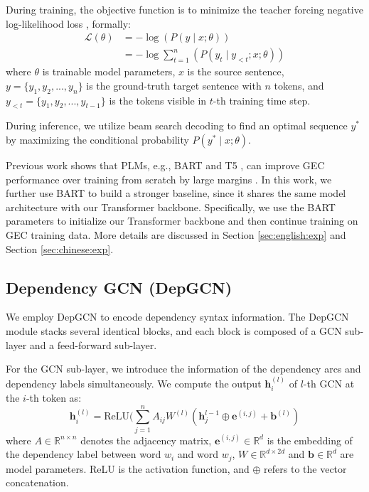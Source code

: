 \documentclass[11pt]{article}
\begin{document}
During training, the objective function is to minimize the teacher forcing negative log-likelihood loss \citep{williams1989learning}, formally:
\begin{equation}
\begin{aligned}
\mathcal{L}(\theta) &=- \log (P(y \mid x;\theta))\\
                &=- \log \sum_{t=1}^{n}(P(y_t \mid y_{<t};x;\theta))
\end{aligned}
\end{equation}
where $\theta$ is trainable model parameters, $x$ is the source sentence,  $y=\{y_1,y_2,...,y_n\}$ is the ground-truth target sentence with $n$ tokens, and  $y_{<t}=\{y_1,y_2,...,y_{t-1}\}$ is the tokens visible in $t$-th training time step.

During inference,  we utilize beam search decoding \citep{DBLP:conf/emnlp/WisemanR16} to find an optimal sequence $y^*$ by maximizing the conditional probability $P(y^* \mid x;\theta)$.  

Previous work shows that PLMs, e.g., BART \citep{lewis2020bart} and T5 \citep{raffel2020exploring}, can improve GEC performance over training from scratch by large margins \citep{rothe2021recipe,sun2022unified}. 
In this work, we further use BART to build a stronger baseline, since it shares the same model architecture with our Transformer backbone. 
Specifically, we use the BART parameters to initialize our Transformer backbone and then continue training on GEC training data. More details are discussed in Section \ref{sec:english:exp} and Section \ref{sec:chinese:exp}. 

\subsection{Dependency GCN (DepGCN)}
We employ DepGCN \cite{DBLP:conf/acl/ZhangLZ20} to encode dependency syntax information.
The DepGCN module stacks several identical blocks, and each block is composed of a GCN sub-layer and a feed-forward sub-layer. 



For the GCN sub-layer, we introduce the information of the dependency arcs and dependency labels simultaneously. We compute the output $\mathbf{h}_i^{(l)}$ of $l$-th GCN at the $i$-th token as:
\begin{equation}
\label{eq-GCN}
    \mathbf{h}_i^{(l)}=\mbox{ReLU}(\sum^n_{j=1}A_{ij}W^{(l)}(\mathbf{h}_j^{l-1} \oplus \mathbf{e}^{(i,j)} +\mathbf{b}^{(l)})
\end{equation}
where $A\in\mathbb{R}^{n \times n}$ denotes the adjacency matrix, 
$\mathbf{e}^{{(i,j)}} \in \mathbb{R}^{d}$ is the embedding of the dependency label between word $w_i$ and word $w_j$, $W\in\mathbb{R}^{d \times 2d}$ and $\mathbf{b}\in\mathbb{R}^{d}$ are model parameters. ReLU \citep{nair2010rectified} is the activation function, and $\oplus$ refers to the vector concatenation. 
\end{document}
